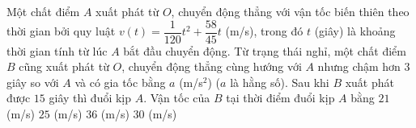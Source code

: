 \begin{ex}%
	Một chất điểm $A$ xuất phát từ $O$, chuyển động thẳng với vận tốc biến thiên theo thời gian bởi quy luật $v(t) = \dfrac{1}{120}t^2 + \dfrac{58}{45}t$ (m/s), trong đó $t$ (giây) là khoảng thời gian tính từ lúc $A$ bắt đầu chuyển động. Từ trạng thái nghỉ, một chất điểm $B$ cũng xuất phát từ $O$, chuyển động thẳng cùng hướng với $A$ nhưng chậm hơn $3$ giây so với $A$ và có gia tốc bằng $a$ (m/s$^2$) ($a$ là hằng số). Sau khi $B$ xuất phát được $15$ giây  thì đuổi kịp $A$. Vận tốc của $B$ tại thời điểm đuổi kịp $A$ bằng
	\choice 
		{$21$ (m/s)} 
		 {$25$ (m/s)}
		 {$36$ (m/s)}
		{\True $30$ (m/s)} 
\end{ex}

